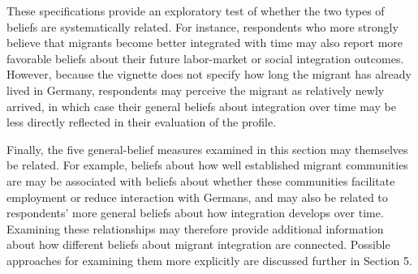 These specifications provide an exploratory test of whether the two types of beliefs are systematically related.
For instance, respondents who more strongly believe that migrants become better integrated with time may also report 
more favorable beliefs about their future labor-market or social integration outcomes. However, because the vignette 
does not specify how long the migrant has already lived in Germany, respondents may perceive the migrant as relatively 
newly arrived, in which case their general beliefs about integration over time may be less directly reflected in their
evaluation of the profile.

Finally, the five general-belief measures examined in this section may themselves be related. For example, beliefs 
about how well established migrant communities are may be associated with beliefs about whether these communities 
facilitate employment or reduce interaction with Germans, and may also be related to respondents' more general beliefs 
about how integration develops over time. Examining these relationships may therefore provide additional information 
about how different beliefs about migrant integration are connected. Possible approaches for examining them more 
explicitly are discussed further in Section 5.
